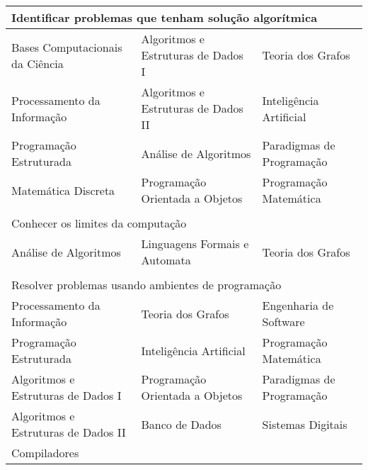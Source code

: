 \begin{longtable}{|p{}p{}p{}|}
    \multicolumn{3}{l}{Identificar problemas que tenham solução algorítmica}\\
    \hline
    \textcolor{nred}{Bases Computacionais da Ciência}  &
    \textcolor{nblue}{Algoritmos e Estruturas de Dados I} &
    \textcolor{nblue}{Teoria dos Grafos}\\
    \textcolor{nred}{Processamento da Informação} &
    \textcolor{nblue}{Algoritmos e Estruturas de Dados II} &
    \textcolor{nblue}{Inteligência Artificial}\\
    \textcolor{nblue}{Programação Estruturada} & \textcolor{nblue}{Análise de
    Algoritmos} & \textcolor{nblue}{Paradigmas de Programação}\\
    \textcolor{nblue}{Matemática Discreta} & \textcolor{nblue}{Programação
    Orientada a Objetos} & \textcolor{nblue}{Programação Matemática}\\
    \hline
    
    \multicolumn{3}{l}{}\\
    
    \multicolumn{3}{l}{Conhecer os limites da computação}\\
    \hline
    \textcolor{nblue}{Análise de Algoritmos} & \textcolor{nblue}{Linguagens
    Formais e Automata} & \textcolor{nblue}{Teoria dos Grafos}\\
    \hline
    
    \multicolumn{3}{l}{}\\
    \multicolumn{3}{l}{Resolver problemas usando ambientes de programação}\\
    \hline
    \textcolor{nred}{Processamento da Informação} &  \textcolor{nblue}{Teoria
    dos Grafos} & \textcolor{nblue}{Engenharia de Software}\\
    \textcolor{nblue}{Programação Estruturada} &
    \textcolor{nblue}{Inteligência Artificial} &  \textcolor{nblue}{Programação
    Matemática}\\
    \textcolor{nblue}{Algoritmos e Estruturas de Dados I} &
    \textcolor{nblue}{Programação Orientada a Objetos} &
    \textcolor{nblue}{Paradigmas de Programação}\\
    \textcolor{nblue}{Algoritmos e Estruturas de Dados II} &
    \textcolor{nblue}{Banco de Dados} &  \textcolor{nblue}{Sistemas Digitais}\\
    \textcolor{nblue}{Compiladores} && \\
    \hline
    

\end{longtable}
